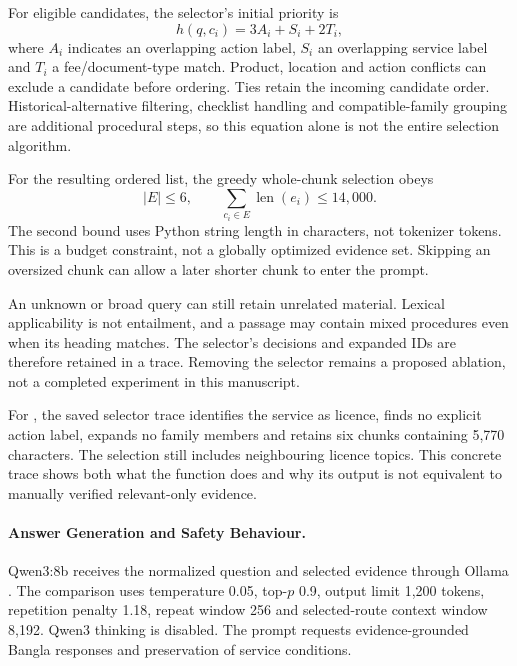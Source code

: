 For eligible candidates, the selector's initial priority is
\begin{equation}
h(q,c_i)=3A_i+S_i+2T_i,
\end{equation}
where $A_i$ indicates an overlapping action label, $S_i$ an overlapping service label and $T_i$ a fee/document-type match. Product, location and action conflicts can exclude a candidate before ordering. Ties retain the incoming candidate order. Historical-alternative filtering, checklist handling and compatible-family grouping are additional procedural steps, so this equation alone is not the entire selection algorithm.

For the resulting ordered list, the greedy whole-chunk selection obeys
\begin{equation}
|E|\leq 6,\qquad \sum_{c_i\in E}\operatorname{len}(e_i)\leq 14{,}000.
\end{equation}
The second bound uses Python string length in characters, not tokenizer tokens. This is a budget constraint, not a globally optimized evidence set. Skipping an oversized chunk can allow a later shorter chunk to enter the prompt.

An unknown or broad query can still retain unrelated material. Lexical applicability is not entailment, and a passage may contain mixed procedures even when its heading matches. The selector's decisions and expanded IDs are therefore retained in a trace. Removing the selector remains a proposed ablation, not a completed experiment in this manuscript.

For , the saved selector trace identifies the service as licence, finds no explicit action label, expands no family members and retains six chunks containing 5,770 characters. The selection still includes neighbouring licence topics. This concrete trace shows both what the function does and why its output is not equivalent to manually verified relevant-only evidence.

\paragraph{Answer Generation and Safety Behaviour.}
Qwen3:8b receives the normalized question and selected evidence through Ollama \cite{qwen3,ollama_docs}. The comparison uses temperature 0.05, top-$p$ 0.9, output limit 1,200 tokens, repetition penalty 1.18, repeat window 256 and selected-route context window 8,192. Qwen3 thinking is disabled. The prompt requests evidence-grounded Bangla responses and preservation of service conditions.

